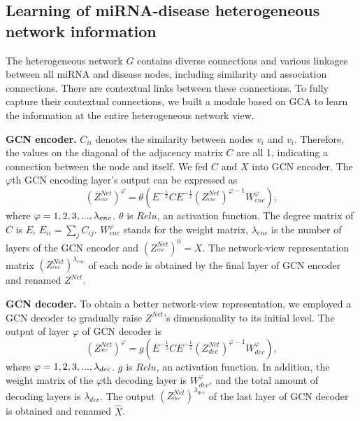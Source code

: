 \documentclass[journal,twoside,web]{ieeecolor}
\begin{document}
\subsection{Learning of miRNA-disease heterogeneous network information}

The heterogeneous network $G$ contains diverse connections and various linkages between all miRNA and disease nodes, including similarity and association connections. There are contextual links between these connections. To fully capture their contextual connections, we built a module based on GCA to learn the information at the entire heterogeneous network view.

\textbf{GCN encoder.} ${C_{ii}}$ denotes the similarity between nodes ${v_i}$ and ${v_i}$. Therefore, the values on the diagonal of the adjacency matrix $C$ are all 1, indicating a connection between the node and itself. We fed $C$ and $X$ into GCN encoder. The $\varphi $th GCN encoding layer's output can be expressed as
\begin{equation}
{\left( {Z_{^{enc}}^{Net}} \right)^\varphi } = \theta \left( {{E^{ - \frac{1}{2}}}C{E^{ - \frac{1}{2}}}{{\left( {Z_{^{enc}}^{Net}} \right)}^{\varphi  - 1}}W_{enc}^\varphi } \right),
\end{equation}
where ${\rm{ }}\varphi  = 1,2,3,...,{\lambda _{enc}}$. $\theta $ is $Relu$, an activation function. The degree matrix of $C$ is $E$, ${E_{ii}} = \sum\nolimits_j {{C_{ij}}} $. $W_{enc}^\varphi $ stands for the weight matrix, ${\lambda _{enc}}$ is the number of layers of the GCN encoder and ${\left( {Z_{^{enc}}^{Net}} \right)^0} = X$. The network-view representation matrix ${\left( {Z_{^{enc}}^{Net}} \right)^{{\lambda _{enc}}}}$ of each node is obtained by the final layer of GCN encoder and renamed ${Z^{Net}}$.

\textbf{GCN decoder.} To obtain a better network-view representation, we employed a GCN decoder to gradually raise ${Z^{Net}}$'s dimensionality to its initial level. The output of layer $\varphi $ of GCN decoder is
\begin{equation}
{\left( {Z_{^{dec}}^{Net}} \right)^\varphi } = g\left( {{E^{ - \frac{1}{2}}}C{E^{ - \frac{1}{2}}}{{\left( {Z_{dec}^{Net}} \right)}^{\varphi  - 1}}W_{dec}^\varphi } \right),
\end{equation}
where ${\rm{ }}\varphi  = 1,2,3,...,{\lambda _{dec}}$. $g$ is $Relu$, an activation function. In addition, the weight matrix of the $\varphi $th decoding layer is $W_{dec}^\varphi $, and the total amount of decoding layers is ${\lambda _{dec}}$. The output ${\left( {Z_{^{dec}}^{Net}} \right)^{{\lambda _{dec}}}}$ of the last layer of GCN decoder is obtained and renamed $\hat X$.
\end{document}
